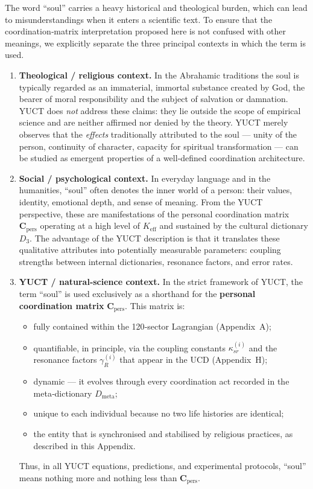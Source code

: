 \documentclass[12pt,a4paper]{article}
\begin{document}
The word ``soul'' carries a heavy historical and theological burden, which
can lead to misunderstandings when it enters a scientific text. To ensure
that the coordination‑matrix interpretation proposed here is not confused
with other meanings, we explicitly separate the three principal contexts in
which the term is used.

\begin{enumerate}[leftmargin=*]
	\item \textbf{Theological / religious context.}
	In the Abrahamic traditions the soul is typically regarded as an
	immaterial, immortal substance created by God, the bearer of moral
	responsibility and the subject of salvation or damnation.  YUCT does
	\emph{not} address these claims: they lie outside the scope of
	empirical science and are neither affirmed nor denied by the theory.
	YUCT merely observes that the \emph{effects} traditionally attributed
	to the soul --- unity of the person, continuity of character,
	capacity for spiritual transformation --- can be studied as emergent
	properties of a well‑defined coordination architecture.
	
	\item \textbf{Social / psychological context.}
	In everyday language and in the humanities, ``soul'' often denotes the
	inner world of a person: their values, identity, emotional depth, and
	sense of meaning.  From the YUCT perspective, these are manifestations
	of the personal coordination matrix \(\mathbf{C}_{\text{pers}}\)
	operating at a high level of \(K_{\mathrm{eff}}\) and sustained by
	the cultural dictionary \(D_3\).  The advantage of the YUCT
	description is that it translates these qualitative attributes into
	potentially measurable parameters: coupling strengths between internal
	dictionaries, resonance factors, and error rates.
	
	\item \textbf{YUCT / natural‑science context.}
	In the strict framework of YUCT, the term ``soul'' is used exclusively
	as a shorthand for the \textbf{personal coordination matrix}
	\(\mathbf{C}_{\text{pers}}\).  This matrix is:
	\begin{itemize}
		\item fully contained within the 120‑sector Lagrangian
		(Appendix~A);
		\item quantifiable, in principle, via the coupling constants
		\(\kappa_{sr}^{(i)}\) and the resonance factors
		\(\gamma_R^{(i)}\) that appear in the UCD (Appendix~H);
		\item dynamic --- it evolves through every coordination act
		recorded in the meta‑dictionary \(D_{\text{meta}}\);
		\item unique to each individual because no two life histories are
		identical;
		\item the entity that is synchronised and stabilised by religious
		practices, as described in this Appendix.
	\end{itemize}
	Thus, in all YUCT equations, predictions, and experimental protocols,
	``soul'' means nothing more and nothing less than \(\mathbf{C}_{\text{pers}}\).
\end{enumerate}
\end{document}
